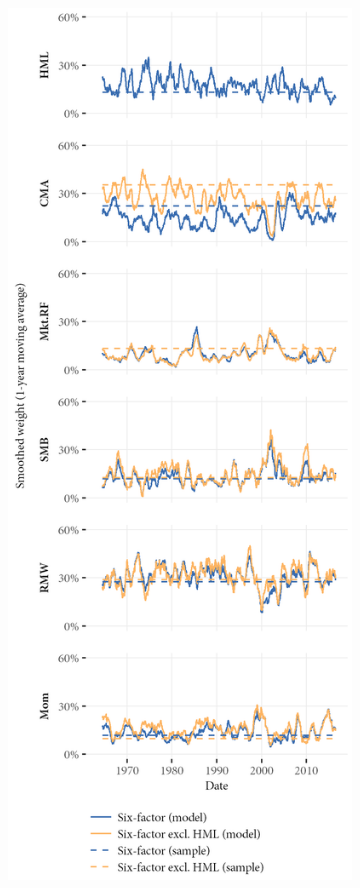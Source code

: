 \begin{figure}[p]
  \centering
  \footnotesize

  \begin{subfigure}{0.45\textwidth}

    \includegraphics[width=\textwidth]{graphics/weights/main_Weights_MV_6F_EXCL_HML_6F.png}

\end{subfigure}
\end{figure}
